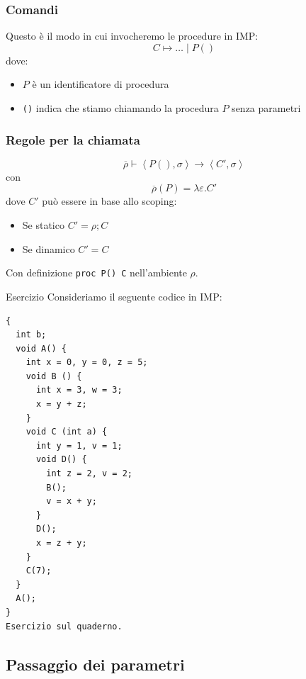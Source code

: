 \documentclass[a4paper]{article}
\begin{document}
\subsubsection*{Comandi}

Questo è il modo in cui invocheremo le procedure in IMP:
\[
  C \mapsto \dots \; | \; P()
\]
dove:
\begin{itemize}
  \item $P$ è un identificatore di procedura
  \item \texttt{()} indica che stiamo chiamando la procedura $P$ senza parametri
\end{itemize}

\subsubsection{Regole per la chiamata} 

\[
  \overline{\rho} \vdash \left<P(), \sigma\right> \rightarrow \left<C', \sigma\right>
\]
con 
\[
  \overline{\rho}(P) = \lambda \varepsilon. C'
\]
dove $C'$ può essere in base allo scoping:
\begin{itemize}
  \item Se statico $C' = \rho ; C$
  \item Se dinamico $C' = C$
\end{itemize}
Con definizione \texttt{proc P() C} nell'ambiente $\rho$.

\begin{Example}{Esercizio}{}
Consideriamo il seguente codice in IMP:
\begin{lstlisting}
{ 
  int b; 
  void A() {
    int x = 0, y = 0, z = 5;
    void B () {
      int x = 3, w = 3; 
      x = y + z; 
    }
    void C (int a) {
      int y = 1, v = 1; 
      void D() {
        int z = 2, v = 2; 
        B();
        v = x + y;
      }
      D();
      x = z + y;
    }
    C(7);
  }
  A();
}
Esercizio sul quaderno.
\end{lstlisting}
\end{Example}

\subsection{Passaggio dei parametri}
\end{document}
